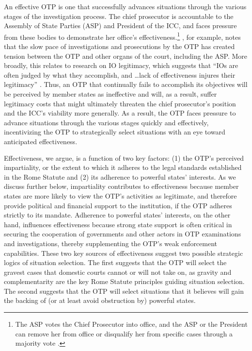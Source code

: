 An effective OTP is one that successfully advances situations through the various stages of the investigation process. The chief prosecutor is accountable to the Assembly of State Parties (ASP) and President of the ICC, and faces pressure from these bodies to demonstrate her office's effectiveness.\footnote{The ASP votes the Chief Prosecutor into office, and the ASP or the President can remove her from office or disqualify her from specific cases through a majority vote \citep[379]{schabas2011introduction}.} \citet{schabas2008prosecutorial}, for example, notes that the slow pace of investigations and prosecutions by the OTP has created tension between the OTP and other organs of the court, including the ASP. More broadly, this relates to research on IO legitimacy, which suggests that ``IOs are often judged by what they accomplish, and \ldots lack of effectiveness injures their legitimacy'' \citep[168]{barnett2004rules}. Thus, an OTP that continually fails to accomplish its objectives will be perceived by member states as ineffective and will, as a result, suffer legitimacy costs that might ultimately threaten the chief prosecutor's position and the ICC's viability more generally. As a result, the OTP faces pressure to advance situations through the various stages quickly and effectively, incentivizing the OTP to strategically select situations with an eye toward anticipated effectiveness.

Effectiveness, we argue, is a function of two key factors: (1) the OTP's perceived impartiality, or the extent to which it adheres to the legal standards established in the Rome Statute \citep{schabas2011introduction} and (2) its adherence to powerful states' interests. As we discuss further below, impartiality contributes to effectiveness because member states are more likely to view the OTP's activities as legitimate, and therefore provide political and financial support to the institution, if the OTP adheres strictly to its mandate. Adherence to powerful states' interests, on the other hand, influences effectiveness because strong state support is often critical in securing the cooperation of governments and other actors in OTP examinations and investigations, thereby supplementing the OTP's weak enforcement capabilities. These two key sources of effectiveness suggest two possible strategic logics of situation selection. The first suggests that the OTP will select the gravest cases that domestic courts cannot or will not take on, as gravity and complementarity are the key Rome Statute principles guiding situation selection. The second suggests that the OTP will select situations that it believes will gain the backing of (or at least avoid obstruction by) powerful states.

